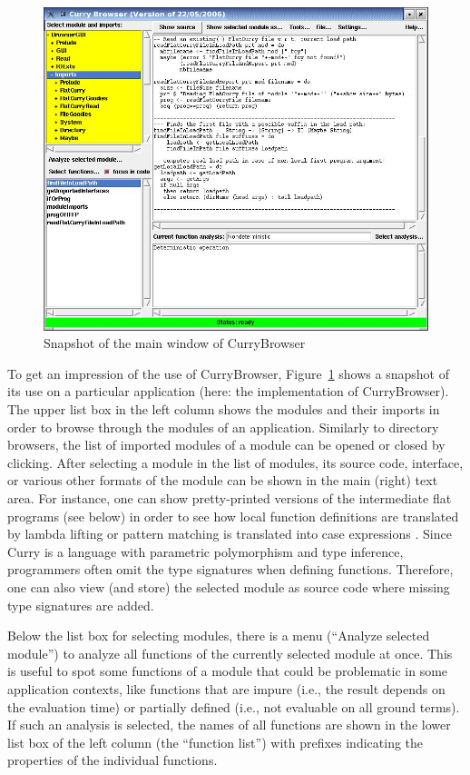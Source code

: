 \documentclass[11pt,fleqn]{article}
\newcommand{\cb}{CurryBrowser\xspace}
\begin{document}
\begin{figure}[t]
\begin{center}
\includegraphics[scale=0.7]{currybrowser.jpg}
\end{center}
\caption{Snapshot of the main window of CurryBrowser\label{fig-currybrowser}}
\end{figure}
%
To get an impression of the use of \cb, Figure~\ref{fig-currybrowser}
shows a snapshot of its use on a particular application
(here: the implementation of \cb).
The upper list box in the left column shows the modules and their imports
in order to browse through the modules of an application.
Similarly to directory browsers, the list of imported modules of a module
can be opened or closed by clicking.
After selecting a module in the list of modules, its source code,
interface, or various other formats of the module can be shown
in the main (right) text area. For instance, one can show
pretty-printed versions of the intermediate flat programs (see below)
in order to see how local function definitions are translated by lambda lifting
\cite{Johnsson85}
or pattern matching is translated into case expressions \cite{Hanus97POPL,Wadler87}.
Since Curry is a language with parametric polymorphism and type inference,
programmers often omit the type signatures when defining functions.
Therefore, one can also view (and store) the selected module as source code where
missing type signatures are added.

Below the list box for selecting modules, there is a menu
(``Analyze selected module'') to analyze all functions
of the currently selected module at once. This is useful
to spot some functions of a module that could be problematic
in some application contexts, like functions that are impure (i.e., the result
depends on the evaluation time) or partially defined (i.e.,
not evaluable on all ground terms).
If such an analysis is selected,
the names of all functions are shown in the
lower list box of the left column (the ``function list'')
with prefixes indicating the properties of the individual functions.
\end{document}
